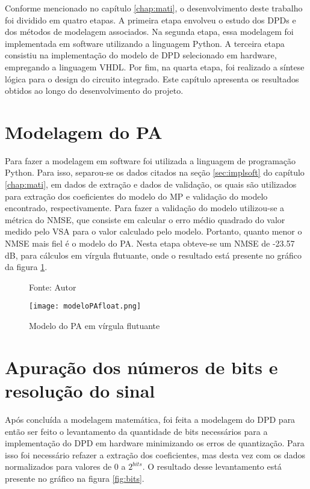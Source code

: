 Conforme mencionado no capítulo \ref{chap:mati}, o desenvolvimento deste trabalho foi dividido em quatro etapas. A primeira etapa envolveu o estudo dos DPDs e dos métodos de modelagem associados. Na segunda etapa, essa modelagem foi implementada em software utilizando a linguagem Python. A terceira etapa consistiu na implementação do modelo de DPD selecionado em hardware, empregando a linguagem VHDL. Por fim, na quarta etapa, foi realizado a síntese lógica para o design do circuito integrado. Este capítulo apresenta os resultados obtidos ao longo do desenvolvimento do projeto.

\section{Modelagem do PA}

Para fazer a modelagem em software foi utilizada a linguagem de programação Python. Para isso, separou-se os dados citados na seção \ref{sec:implsoft} do capítulo \ref{chap:mati}, em dados de extração e dados de validação, os quais são utilizados para extração dos coeficientes do modelo do MP e validação do modelo encontrado, respectivamente. Para fazer a validação do modelo utilizou-se a métrica do NMSE, que consiste em calcular o erro médio quadrado do valor medido pelo VSA para o valor calculado pelo modelo. Portanto, quanto menor o NMSE mais fiel é o modelo do PA. Nesta etapa obteve-se um NMSE de -23.57 dB, para cálculos em vírgula flutuante, onde o resultado está presente no gráfico da figura \ref{fig:modelopafloat}.

\begin{figure}[ht!]
    \centering
    \captionsetup{justification=centering}
    \caption*{Fonte: Autor}
    \texttt{[image: modeloPAfloat.png]}
    \caption{Modelo do PA em vírgula flutuante}
    \label{fig:modelopafloat}
\end{figure}

\section{Apuração dos números de bits e resolução do sinal} 

Após concluída a modelagem matemática, foi feita a modelagem do DPD para então ser feito o levantamento da quantidade de bits necessários para a implementação do DPD em hardware minimizando os erros de quantização. 
Para isso foi necessário refazer a extração dos coeficientes, mas desta vez com os dados normalizados para valores de 0 a $2^{bits}$.  
O resultado desse levantamento está presente no gráfico na figura \ref{fig:bits}.

